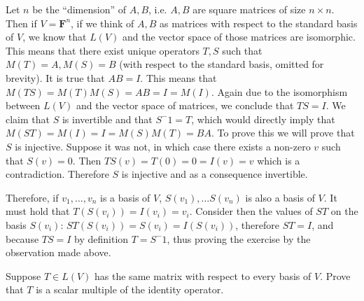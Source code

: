 \begin{solution}

    Let $n$ be the ``dimension'' of $A, B$, i.e. $A, B$ are square matrices of size $n \times n$. Then if $V = \mathbf{F}^n$, if we think of $A, B$ as matrices with respect to the standard basis of $V$, we know that $L(V)$ and the vector space of those matrices are isomorphic. This means that there exist unique operators $T, S$ such that $M(T) = A, M(S) = B$ (with respect to the standard basis, omitted for brevity). It is true that $AB = I$. This means that $M(TS) = M(T)M(S) = AB = I = M(I)$. Again due to the isomorphism between $L(V)$ and the vector space of matrices, we conclude that $TS = I$. We claim that $S$ is invertible and that $S^-1 = T$, which would directly imply that $M(ST) = M(I) = I = M(S)M(T) = BA$. To prove this we will prove that $S$ is injective. Suppose it was not, in which case there exists a non-zero $v$ such that $S(v) = 0$. Then $TS(v) = T(0) = 0 = I(v) = v$ which is a contradiction. Therefore $S$ is injective and as a consequence invertible.

    Therefore, if $v_1, \ldots, v_n$ is a basis of $V$, $S(v_1), \ldots S(v_n)$ is also a basis of $V$. It must hold that $T(S(v_i)) = I(v_i) = v_i$. Consider then the values of $ST$ on the basis $S(v_i)$: $ST(S(v_i)) = S(v_i) = I(S(v_i))$, therefore $ST = I$, and because $TS = I$ by definition $T = S^-1$, thus proving the exercise by the observation made above.
\end{solution}

\begin{exercise}{3}
    Suppose $T \in L(V)$ has the same matrix with respect to every basis of $V$. Prove that $T$ is a scalar multiple of the identity operator.
\end{exercise}

